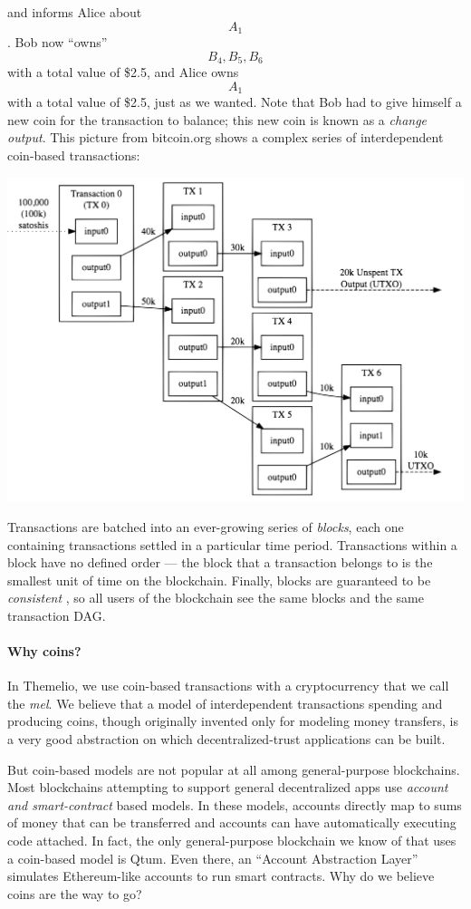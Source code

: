 \documentclass[]{article}
\let\oldparagraph\paragraph
\renewcommand{\paragraph}[1]{\oldparagraph{#1}\mbox{}}
\begin{document}
and informs Alice about \[A_1\]. Bob now ``owns'' \[B_4,B_5,B_6\] with a
total value of \$2.5, and Alice owns \[A_1\] with a total value of
\$2.5, just as we wanted. Note that Bob had to give himself a new coin
for the transaction to balance; this new coin is known as a \emph{change
output}. This picture from bitcoin.org shows a complex series of
interdependent coin-based transactions:

\includegraphics{../.gitbook/assets/utxo.svg}

Transactions are batched into an ever-growing series of \emph{blocks},
each one containing transactions settled in a particular time period.
Transactions within a block have no defined order --- the block that a
transaction belongs to is the smallest unit of time on the blockchain.
Finally, blocks are guaranteed to be \emph{consistent} , so all users of
the blockchain see the same blocks and the same transaction DAG.

\hypertarget{why-coins}{%
\paragraph{Why coins?}\label{why-coins}}

In Themelio, we use coin-based transactions with a cryptocurrency that
we call the \emph{mel}. We believe that a model of interdependent
transactions spending and producing coins, though originally invented
only for modeling money transfers, is a very good abstraction on which
decentralized-trust applications can be built.

But coin-based models are not popular at all among general-purpose
blockchains. Most blockchains attempting to support general
decentralized apps use \emph{account and smart-contract} based models.
In these models, accounts directly map to sums of money that can be
transferred and accounts can have automatically executing code attached.
In fact, the only general-purpose blockchain we know of that uses a
coin-based model is Qtum. Even there, an ``Account Abstraction Layer''
simulates Ethereum-like accounts to run smart contracts. Why do we
believe coins are the way to go?
\end{document}
